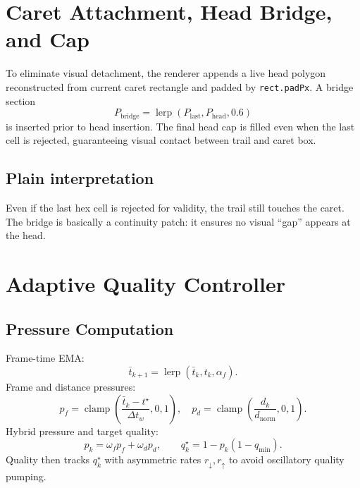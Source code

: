 \documentclass[journal]{IEEEtran}
\begin{document}
\section{Caret Attachment, Head Bridge, and Cap}

To eliminate visual detachment, the renderer appends a live head polygon reconstructed from current caret rectangle and padded by \texttt{rect.padPx}. A bridge section
\begin{equation}
P_{\text{bridge}}=\operatorname{lerp}(P_{\text{last}},P_{\text{head}},0.6)
\end{equation}
is inserted prior to head insertion. The final head cap is filled even when the last cell is rejected, guaranteeing visual contact between trail and caret box.

\subsection{Plain interpretation}
Even if the last hex cell is rejected for validity, the trail still touches the caret. The bridge is basically a continuity patch: it ensures no visual ``gap'' appears at the head.

\section{Adaptive Quality Controller}

\subsection{Pressure Computation}
Frame-time EMA:
\begin{equation}
\bar{t}_{k+1}=\operatorname{lerp}(\bar{t}_k,t_k,\alpha_f).
\end{equation}
Frame and distance pressures:
\begin{equation}
p_f=\operatorname{clamp}\!\left(\frac{\bar{t}_k-t^\star}{\Delta t_w},0,1\right),\quad
p_d=\operatorname{clamp}\!\left(\frac{d_k}{d_{\text{norm}}},0,1\right).
\end{equation}
Hybrid pressure and target quality:
\begin{equation}
p_k=\omega_f p_f + \omega_d p_d,\qquad
q_k^\star = 1 - p_k(1-q_{\min}).
\end{equation}
Quality then tracks \(q_k^\star\) with asymmetric rates \(r_\downarrow, r_\uparrow\) to avoid oscillatory quality pumping.
\end{document}
